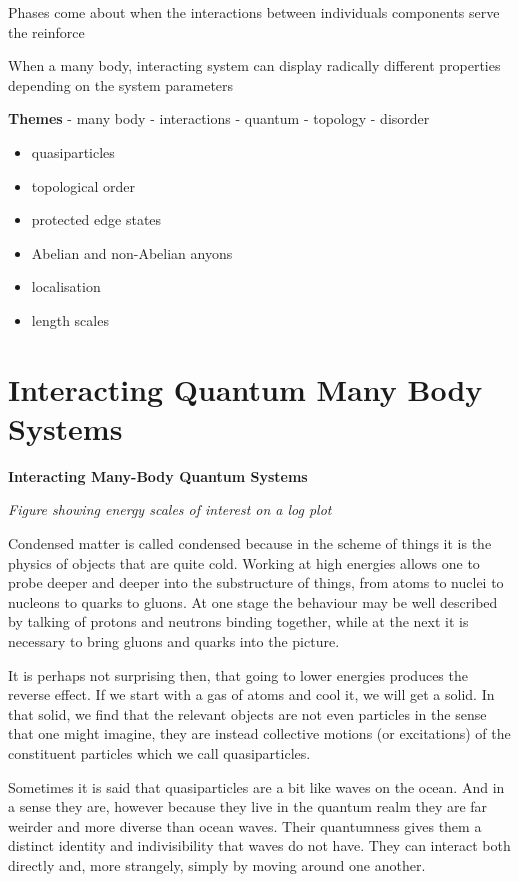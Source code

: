 Phases come about when the interactions between individuals components serve the reinforce

When a many body, interacting system can display radically different properties depending on the system parameters

\textbf{Themes} - many body - interactions - quantum - topology - disorder

\begin{itemize}
\item
  quasiparticles
\item
  topological order
\item
  protected edge states
\item
  Abelian and non-Abelian anyons
\item
  localisation
\item
  length scales
\end{itemize}

\hypertarget{interacting-quantum-many-body-systems}{%
\section{Interacting Quantum Many Body Systems}\label{interacting-quantum-many-body-systems}}

\textbf{Interacting Many-Body Quantum Systems}

\emph{Figure showing energy scales of interest on a log plot}

Condensed matter is called condensed because in the scheme of things it is the physics of objects that are quite cold. Working at high energies allows one to probe deeper and deeper into the substructure of things, from atoms to nuclei to nucleons to quarks to gluons. At one stage the behaviour may be well described by talking of protons and neutrons binding together, while at the next it is necessary to bring gluons and quarks into the picture.

It is perhaps not surprising then, that going to lower energies produces the reverse effect. If we start with a gas of atoms and cool it, we will get a solid. In that solid, we find that the relevant objects are not even particles in the sense that one might imagine, they are instead collective motions (or excitations) of the constituent particles which we call quasiparticles.

Sometimes it is said that quasiparticles are a bit like waves on the ocean. And in a sense they are, however because they live in the quantum realm they are far weirder and more diverse than ocean waves. Their quantumness gives them a distinct identity and indivisibility that waves do not have. They can interact both directly and, more strangely, simply by moving around one another.

